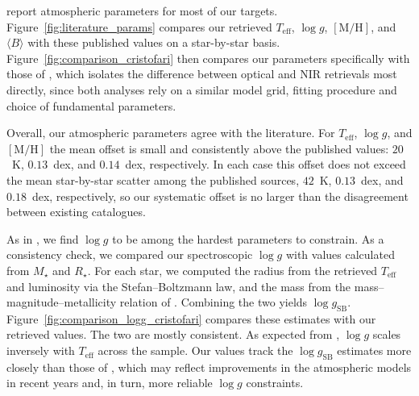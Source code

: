 
\citet{cristofari_2023b, cristofari+2022b, reiners+2022, Marfil_2021, Passegger_2019, Schweitzer_2019} report atmospheric parameters for most of our targets. Figure~\ref{fig:literature_params} compares our retrieved $T_\mathrm{eff}$, $\log g$, $[\mathrm{M/H}]$, and $\langle B\rangle$ with these published values on a star-by-star basis. Figure~\ref{fig:comparison_cristofari} then compares our parameters specifically with those of \citet{cristofari_2023b}, which isolates the difference between optical and NIR retrievals most directly, since both analyses rely on a similar model grid, fitting procedure and choice of fundamental parameters.

Overall, our atmospheric parameters agree with the literature. For $T_\mathrm{eff}$, $\log g$, and $[\mathrm{M/H}]$ the mean offset is small and consistently above the published values: $20$~K, $0.13$~dex, and $0.14$~dex, respectively. In each case this offset does not exceed the mean star-by-star scatter among the published sources, $42$~K, $0.13$~dex, and $0.18$~dex, respectively, so our systematic offset is no larger than the disagreement between existing catalogues.

As in \citet{cristofari_2023b}, we find $\log g$ to be among the hardest parameters to constrain. As a consistency check, we compared our spectroscopic $\log g$ with values calculated from $M_\star$ and $R_\star$. For each star, we computed the radius from the retrieved $T_\mathrm{eff}$ and luminosity via the Stefan--Boltzmann law, and the mass from the mass--magnitude--metallicity relation of \citet{Mann_2015}. Combining the two yields $\log g_\mathrm{SB}$. Figure~\ref{fig:comparison_logg_cristofari} compares these estimates with our retrieved values. The two are mostly consistent. As expected from \citet{Maldonado_2015}, $\log g$ scales inversely with $T_\mathrm{eff}$ across the sample. Our values track the $\log g_\mathrm{SB}$ estimates more closely than those of \citet{cristofari_2023b}, which may reflect improvements in the atmospheric models in recent years and, in turn, more reliable $\log g$ constraints.

